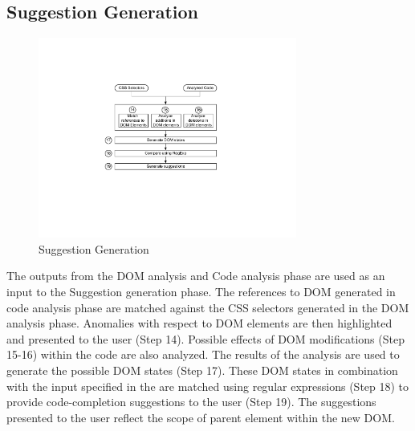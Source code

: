 	
	\subsection{Suggestion Generation}
	\label{Sec:Suggestions}
		\begin{figure}
			\centering
			\includegraphics[width=85mm]{images/suggestions.pdf}
			\caption{Suggestion Generation}
			\label{Fig:Suggestions}
		\end{figure}
		
		The outputs from the DOM analysis and Code analysis phase are used as an input to the Suggestion generation phase. The references to DOM generated in code analysis phase are matched against the CSS selectors generated in the DOM analysis phase. Anomalies with respect to DOM elements are then highlighted and presented to the user (Step 14). Possible effects of DOM modifications (Step 15-16) within the \javascript code are also analyzed. The results of the analysis are used to generate the possible DOM states (Step 17). These DOM states in combination with the input specified in the  are matched using regular expressions (Step 18) to provide code-completion suggestions to the user (Step 19). The suggestions presented to the user reflect the scope of parent element within the new DOM.
		
